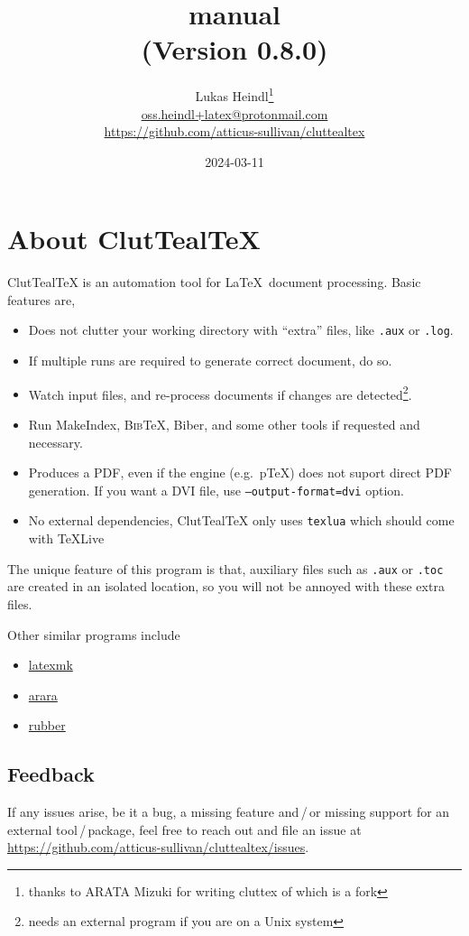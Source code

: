 \documentclass[a4paper, 11pt]{scrartcl}
\title{\CluttealTeX manual\\(Version 0.8.0)} %
\author{%
	Lukas Heindl\thanks{thanks to ARATA Mizuki for writing cluttex of which \CluttealTeX is a fork}\\
	\url{oss.heindl+latex@protonmail.com} \\
	\url{https://github.com/atticus-sullivan/cluttealtex}
}
\date{2024-03-11} %
\newcommand\CluttealTeX{ClutTeal\TeX\xspace}
\providecommand\BibTeX{\textsc{Bib}\TeX\xspace}
\begin{document}
\maketitle
\tableofcontents

\section{About \CluttealTeX}
\CluttealTeX is an automation tool for \LaTeX\ document processing.
Basic features are,
\begin{itemize}
	\item Does not clutter your working directory with \enquote{extra} files, like \texttt{.aux} or \texttt{.log}.
	\item If multiple runs are required to generate correct document, do so.
	\item Watch input files, and re-process documents if changes are detected\footnote{needs an external program if you are on a Unix system}.
	\item Run MakeIndex, \BibTeX, Biber, and some other tools if requested and necessary.
	\item Produces a PDF, even if the engine (e.g.\ p\TeX) does not suport direct PDF generation.
		If you want a DVI file, use \texttt{--output-format=dvi} option.
	\item No external dependencies, \CluttealTeX only uses \texttt{texlua} which should come with TeXLive
\end{itemize}

The unique feature of this program is that, auxiliary files such as \texttt{.aux} or \texttt{.toc} are created in an isolated location, so you will not be annoyed with these extra files.

Other similar programs include
\begin{itemize}
	\item \href{https://ctan.org/pkg/latexmk/}{latexmk}
	\item \href{https://ctan.org/pkg/arara/}{arara}
	\item \href{https://gitlab.com/latex-rubber/rubber/}{rubber}
\end{itemize}

\subsection{Feedback}
If any issues arise, be it a bug, a missing feature and\,/\,or missing support for an external tool\,/\,package, feel free to reach out and file an issue at \url{https://github.com/atticus-sullivan/cluttealtex/issues}.
\end{document}
